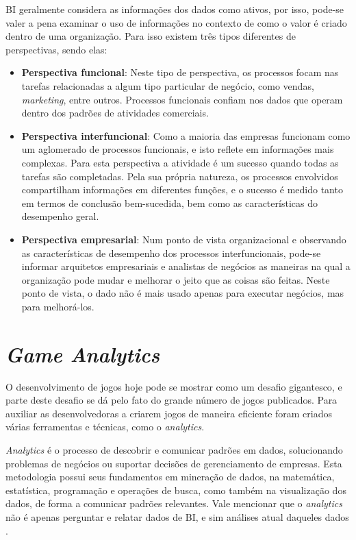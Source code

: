 BI geralmente considera as informações dos dados como ativos, por isso, pode-se valer a pena examinar o uso de informações no contexto de como o valor é criado dentro de uma organização. Para isso existem três tipos diferentes de perspectivas, sendo elas:
\begin{itemize}
		\item \textbf{Perspectiva funcional}: Neste tipo de perspectiva, os processos focam nas tarefas relacionadas a algum tipo particular de negócio, como vendas, \textit{marketing}, entre outros. Processos funcionais confiam nos dados que operam dentro dos padrões de atividades comerciais.
		\item \textbf{Perspectiva interfuncional}: Como a maioria das empresas funcionam como um aglomerado de processos funcionais, e isto reflete em informações mais complexas. Para esta perspectiva a atividade é um sucesso quando todas as tarefas são completadas. Pela sua própria natureza, os processos envolvidos compartilham informações em diferentes funções, e o sucesso é medido tanto em termos de conclusão bem-sucedida, bem como as características do desempenho geral.
		\item \textbf{Perspectiva empresarial}: Num ponto de vista organizacional e observando as características de desempenho dos processos interfuncionais, pode-se informar arquitetos empresariais e analistas de negócios as maneiras na qual a organização pode mudar e melhorar o jeito que as coisas são feitas. Neste ponto de vista, o dado não é mais usado apenas para executar negócios, mas para melhorá-los.
\end{itemize}

\section{\textit{Game Analytics}}
O desenvolvimento de jogos hoje pode se mostrar como um desafio gigantesco, e parte deste desafio se dá pelo fato do grande número de jogos publicados. Para auxiliar as desenvolvedoras a criarem jogos de maneira eficiente foram criados várias ferramentas e técnicas, como o \textit{analytics}.

\textit{Analytics} é o processo de descobrir e comunicar padrões em dados, solucionando problemas de negócios ou suportar decisões de gerenciamento de empresas. Esta metodologia possui seus fundamentos em mineração de dados, na matemática, estatística, programação e operações de busca, como também na visualização dos dados, de forma a comunicar padrões relevantes. Vale mencionar que o \textit{analytics} não é apenas perguntar e relatar dados de BI, e sim análises atual daqueles dados \cite{analytics}. 

